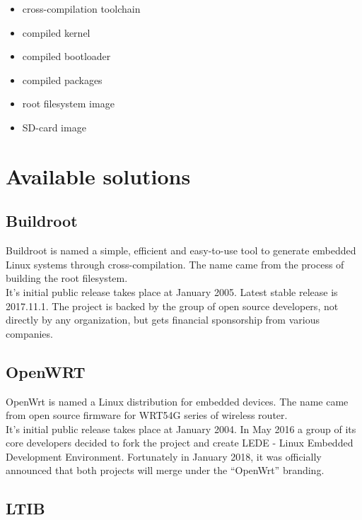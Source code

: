 \documentclass[printmode]{mgr}
\begin{document}
\begin{itemize}
    \item cross-compilation toolchain
    \item compiled kernel
    \item compiled bootloader
    \item compiled packages
    \item root filesystem image
    \item SD-card image
\end{itemize}

\chapter{Available solutions}


\section{Buildroot}

Buildroot is named a simple, efficient and easy-to-use tool to generate embedded Linux systems through cross-compilation. The name came from the process of building the root filesystem.
\\
It's initial public release takes place at January 2005. Latest stable release is 2017.11.1. The project is backed by the group of open source developers, not directly by any organization, but gets financial sponsorship from various companies.

\section{OpenWRT}

OpenWrt is named a Linux distribution for embedded devices. The name came from open source firmware for WRT54G series of wireless router.
\\
It's initial public release takes place at January 2004. In May 2016 a group of its core developers decided to fork the project and create LEDE - Linux Embedded Development Environment. Fortunately in January 2018, it was officially announced that both projects will merge under the ``OpenWrt'' branding.

\section{LTIB}
\end{document}
